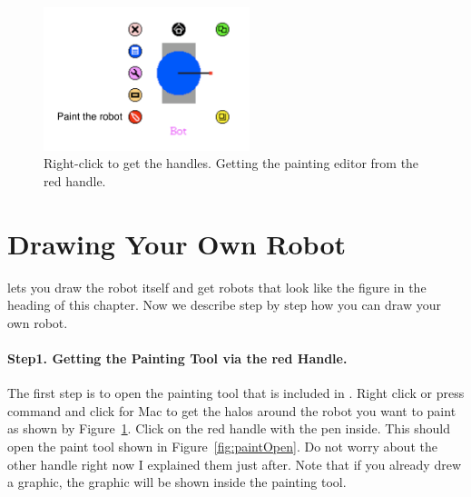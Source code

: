 \begin{figure}[h]
\begin{center}
\includegraphics[width=6cm]{picaHaloAnnotated} 
\end{center}
\caption{Right-click to get the handles. \label{fig:paintToolCaroFlap} Getting the painting editor from the red handle.}
\end{figure}


\section{Drawing Your Own Robot}\label{sec:drawingTurtle}
\sq lets you  draw the robot itself and get robots that look like the  figure in the heading of this chapter. Now we describe step by step how you can draw your own robot. 

\paragraph{Step1. Getting the Painting Tool via the red Handle.}
The first step is to open the painting tool that is included in \sq. 
Right click or press command and click for Mac to get the halos around the robot you want to paint as shown by Figure~\ref{fig:paintToolCaroFlap}. Click on the red handle with the pen inside. This should open the paint tool shown in Figure~\ref{fig:paintOpen}. Do not worry about the other handle right now I explained them just after. 
Note that if you already drew a graphic, the graphic will be shown inside the painting tool. 





